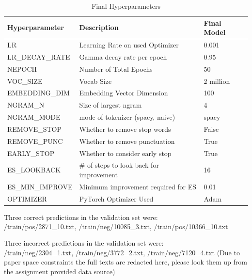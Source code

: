 \documentclass[a4paper,10pt]{article}
\begin{document}
\begin{table}[!htbp]
\begin{tabular}{| l | l | l |}
\hline
Hyperparameter   & Description                                & Final Model    \\
\hline
LR               & Learning Rate on used Optimizer            & 0.001          \\
LR\_DECAY\_RATE  & Gamma decay rate per epoch                 & 0.95           \\
NEPOCH           & Number of Total Epochs                     & 50             \\
VOC\_SIZE        & Vocab Size                                 & 2 million      \\
EMBEDDING\_DIM   & Embedding Vector Dimension                 & 100            \\
NGRAM\_N         & Size of largest ngram                      & 4              \\
NGRAM\_MODE      & mode of tokenizer (spacy, naive)           & spacy          \\
REMOVE\_STOP     & Whether to remove stop words               & False          \\
REMOVE\_PUNC     & Whether to remove punctuation              & True           \\
EARLY\_STOP      & Whether to consider early stop             & True           \\
ES\_LOOKBACK     & \# of steps to look back for improvement   & 16             \\
ES\_MIN\_IMPROVE & Minimum improvement required for ES        & 0.01           \\
OPTIMIZER        & PyTorch Optimizer Used                     & Adam           \\
\hline
\end{tabular}
\caption{Final Hyperparameters}\label{tbl:finalhparams}
\end{table}

\par
\justify
Three correct predictions in the validation set were: \\{/train/pos/2871\_10.txt}, {/train/neg/10085\_3.txt}, {/train/pos/10366\_10.txt}

\par
\justify
Three incorrect predictions in the validation set were: \\{/train/neg/2304\_1.txt}, {/train/neg/3772\_2.txt}, {/train/neg/7120\_4.txt} (Due to paper space constraints the full texts are redacted here, please look them up from the assignment provided data source)
\end{document}
